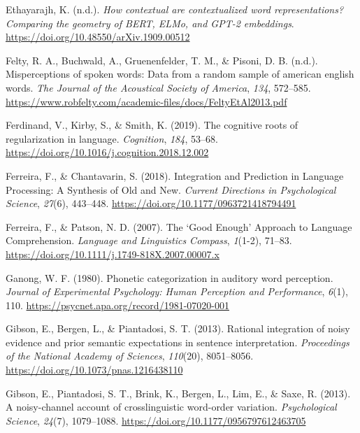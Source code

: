 \documentclass[
  12pt,
  letterpaper,
]{scrreport}
\newlength{\cslhangindent}
\newenvironment{CSLReferences}[2] %
 {\begin{list}{}{%
  \setlength{\itemindent}{0pt}
  \setlength{\leftmargin}{0pt}
  \setlength{\parsep}{0pt}
  \ifodd #1
   \setlength{\leftmargin}{\cslhangindent}
   \setlength{\itemindent}{-1\cslhangindent}
  \fi
  \setlength{\itemsep}{#2\baselineskip}}}
 {\end{list}}
\begin{document}
\begin{CSLReferences}{1}{0}
Ethayarajh, K. (n.d.). \emph{How contextual are contextualized word
representations? Comparing the geometry of BERT, ELMo, and GPT-2
embeddings}. \url{https://doi.org/10.48550/arXiv.1909.00512}

Felty, R. A., Buchwald, A., Gruenenfelder, T. M., \& Pisoni, D. B.
(n.d.). Misperceptions of spoken words: Data from a random sample of
american english words. \emph{The Journal of the Acoustical Society of
America}, \emph{134}, 572--585.
\url{https://www.robfelty.com/academic-files/docs/FeltyEtAl2013.pdf}

Ferdinand, V., Kirby, S., \& Smith, K. (2019). The cognitive roots of
regularization in language. \emph{Cognition}, \emph{184}, 53--68.
\url{https://doi.org/10.1016/j.cognition.2018.12.002}

Ferreira, F., \& Chantavarin, S. (2018). Integration and Prediction in
Language Processing: A Synthesis of Old and New. \emph{Current
Directions in Psychological Science}, \emph{27}(6), 443--448.
\url{https://doi.org/10.1177/0963721418794491}

Ferreira, F., \& Patson, N. D. (2007). The {`}Good Enough{'} Approach to
Language Comprehension. \emph{Language and Linguistics Compass},
\emph{1}(1-2), 71--83.
\url{https://doi.org/10.1111/j.1749-818X.2007.00007.x}

Ganong, W. F. (1980). Phonetic categorization in auditory word
perception. \emph{Journal of Experimental Psychology: Human Perception
and Performance}, \emph{6}(1), 110.
\url{https://psycnet.apa.org/record/1981-07020-001}

Gibson, E., Bergen, L., \& Piantadosi, S. T. (2013). Rational
integration of noisy evidence and prior semantic expectations in
sentence interpretation. \emph{Proceedings of the National Academy of
Sciences}, \emph{110}(20), 8051--8056.
\url{https://doi.org/10.1073/pnas.1216438110}

Gibson, E., Piantadosi, S. T., Brink, K., Bergen, L., Lim, E., \& Saxe,
R. (2013). A noisy-channel account of crosslinguistic word-order
variation. \emph{Psychological Science}, \emph{24}(7), 1079--1088.
\url{https://doi.org/10.1177/0956797612463705}


\end{CSLReferences}
\end{document}
